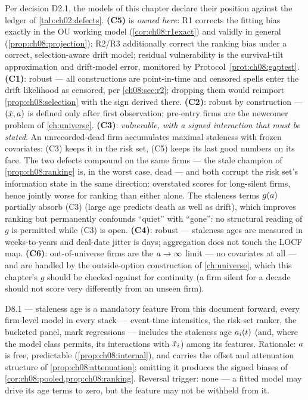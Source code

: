 Per decision D2.1, the models of this chapter declare their position
against the ledger of \cref{tab:ch02:defects}. \textbf{(C5)} is
\emph{owned here}: R1 corrects the fitting bias exactly in the OU
working model (\cref{cor:ch08:r1exact}) and validly in general
(\cref{prop:ch08:projection}); R2/R3 additionally correct the ranking
bias under a correct, selection-aware drift model; residual
vulnerability is the survival-tilt approximation and drift-model error,
monitored by Protocol~\ref{prot:ch08:gaptest}. \textbf{(C1)}: robust ---
all constructions are point-in-time and censored spells enter the drift
likelihood as censored, per \cref{ch08:sec:r2}; dropping them would
reimport \cref{prop:ch08:selection} with the sign derived there.
\textbf{(C2)}: robust by construction --- $(\tilde{x}, a)$ is
defined only after first observation; pre-entry firms are the newcomer
problem of \cref{ch:universe}. \textbf{(C3)}: \emph{vulnerable, with a
signed interaction that must be stated}. An unrecorded-dead firm
accumulates maximal staleness with frozen covariates: (C3) keeps it in
the risk set, (C5) keeps its last good numbers on its face. The two
defects compound on the same firms --- the stale champion of
\cref{prop:ch08:ranking} is, in the worst case, dead --- and both
corrupt the risk set's information state in the same direction:
overstated scores for long-silent firms, hence jointly worse for
ranking than either alone. The staleness terms $g(a)$ partially
absorb (C3) (large age predicts death as well as drift), which improves
ranking but permanently confounds ``quiet'' with ``gone'': no structural
reading of $g$ is permitted while (C3) is open. \textbf{(C4)}: robust
--- staleness ages are measured in weeks-to-years and deal-date jitter
is days; aggregation does not touch the LOCF map. \textbf{(C6)}:
out-of-universe firms are the $a \to \infty$ limit --- no
covariates at all --- and are handled by the outside-option construction
of \cref{ch:universe}, which this chapter's $g$ should be checked
against for continuity (a firm silent for a decade should not score very
differently from an unseen firm).

\begin{decision}{D8.1 --- staleness age is a mandatory feature}
From this document forward, every firm-level model in every stack ---
event-time intensities, the risk-set ranker, the bucketed panel, mark
regressions --- includes the staleness age $a_i(t)$ (and, where
the model class permits, its interactions with $\tilde{x}_i$) among
its features. Rationale: $a$ is free, predictable
(\cref{prop:ch08:internal}), and carries the offset and attenuation
structure of \cref{prop:ch08:attenuation}; omitting it produces the
signed biases of \cref{cor:ch08:pooled,prop:ch08:ranking}. Reversal
trigger: none --- a fitted model may drive its age terms to zero, but
the feature may not be withheld from it.
\end{decision}

